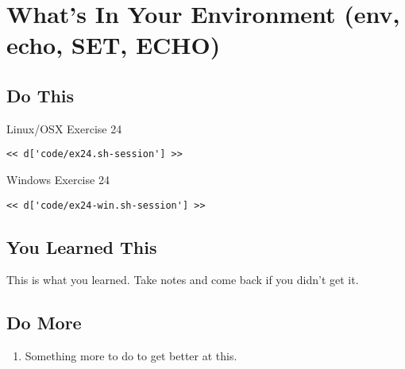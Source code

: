 \chapter{What's In Your Environment (env, echo, SET, ECHO)}

\section{Do This}

\begin{code}{Linux/OSX Exercise 24}
\begin{Verbatim}
<< d['code/ex24.sh-session'] >>
\end{Verbatim}
\end{code}

\begin{code}{Windows Exercise 24}
\begin{Verbatim}
<< d['code/ex24-win.sh-session'] >>
\end{Verbatim}
\end{code}

\section{You Learned This}

This is what you learned.  Take notes and come back if you didn't get it.

\section{Do More}

\begin{enumerate}
\item Something more to do to get better at this.
\end{enumerate}

